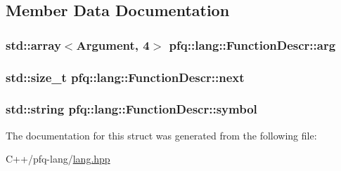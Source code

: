 \subsection{Member Data Documentation}
\hypertarget{structpfq_1_1lang_1_1FunctionDescr_a2be2814d79d9836cd8e4adbc4dc4e1ca}{
\subsubsection[{arg}]{\setlength{\rightskip}{0pt plus 5cm}std\+::array$<${\bf Argument}, 4$>$ pfq\+::lang\+::\+Function\+Descr\+::arg}}\label{structpfq_1_1lang_1_1FunctionDescr_a2be2814d79d9836cd8e4adbc4dc4e1ca}
\hypertarget{structpfq_1_1lang_1_1FunctionDescr_aed683dff23bcead8e4a16ac21ef8ae68}{
\subsubsection[{next}]{\setlength{\rightskip}{0pt plus 5cm}std\+::size\+\_\+t pfq\+::lang\+::\+Function\+Descr\+::next}}\label{structpfq_1_1lang_1_1FunctionDescr_aed683dff23bcead8e4a16ac21ef8ae68}
\hypertarget{structpfq_1_1lang_1_1FunctionDescr_a21f51c65f55dddd54de1171d8914c030}{
\subsubsection[{symbol}]{\setlength{\rightskip}{0pt plus 5cm}std\+::string pfq\+::lang\+::\+Function\+Descr\+::symbol}}\label{structpfq_1_1lang_1_1FunctionDescr_a21f51c65f55dddd54de1171d8914c030}


The documentation for this struct was generated from the following file\+:\begin{DoxyCompactItemize}
\item 
C++/pfq-\/lang/\hyperlink{lang_8hpp}{lang.\+hpp}\end{DoxyCompactItemize}
